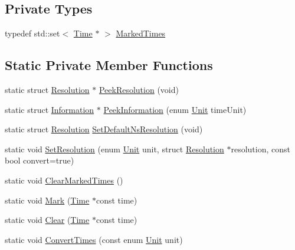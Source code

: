 \subsection*{Private Types}
\begin{DoxyCompactItemize}
\item 
typedef std\+::set$<$ \hyperlink{classns3_1_1Time}{Time} $\ast$ $>$ \hyperlink{classns3_1_1Time_add356cdcb7ac7730a0f9ad22770f81cc}{Marked\+Times}
\end{DoxyCompactItemize}
\subsection*{Static Private Member Functions}
\begin{DoxyCompactItemize}
\item 
static struct \hyperlink{structns3_1_1Time_1_1Resolution}{Resolution} $\ast$ \hyperlink{classns3_1_1Time_a963e53522278fcbdf1ab9f7adbd0f5d6}{Peek\+Resolution} (void)
\item 
static struct \hyperlink{structns3_1_1Time_1_1Information}{Information} $\ast$ \hyperlink{classns3_1_1Time_a0b023c55c20582aa7c1781aacf128034}{Peek\+Information} (enum \hyperlink{classns3_1_1Time_a87a7f4d29c68b047a72d291ad660295a}{Unit} time\+Unit)
\item 
static struct \hyperlink{structns3_1_1Time_1_1Resolution}{Resolution} \hyperlink{classns3_1_1Time_a6a872e62f71dfa817fef2c549473d980}{Set\+Default\+Ns\+Resolution} (void)
\item 
static void \hyperlink{classns3_1_1Time_aba6ca5fd762a8c94884f76f957dd39cf}{Set\+Resolution} (enum \hyperlink{classns3_1_1Time_a87a7f4d29c68b047a72d291ad660295a}{Unit} unit, struct \hyperlink{structns3_1_1Time_1_1Resolution}{Resolution} $\ast$resolution, const bool convert=true)
\item 
static void \hyperlink{classns3_1_1Time_a2fa8d441c8f509653b3ffa94cc20db91}{Clear\+Marked\+Times} ()
\item 
static void \hyperlink{classns3_1_1Time_aa7eef2a1119c1c4855d99f1e83d44c54}{Mark} (\hyperlink{classns3_1_1Time}{Time} $\ast$const time)
\item 
static void \hyperlink{classns3_1_1Time_a82787e216ab524ddd6b3b968bdff5036}{Clear} (\hyperlink{classns3_1_1Time}{Time} $\ast$const time)
\item 
static void \hyperlink{classns3_1_1Time_ab9aa5b31389ff3d227e0eaf89250d787}{Convert\+Times} (const enum \hyperlink{classns3_1_1Time_a87a7f4d29c68b047a72d291ad660295a}{Unit} unit)
\end{DoxyCompactItemize}

